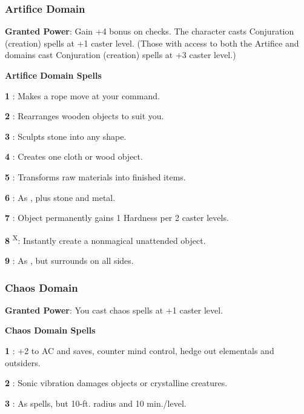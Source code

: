 \subsubsection{Artifice Domain}

\textbf{Granted Power}: Gain +4 bonus on  checks. The character casts Conjuration (creation) spells at +1 caster level. (Those with access to both the Artifice and  domains cast Conjuration (creation) spells at +3 caster level.)

\textbf{Artifice Domain Spells}

\textbf{1} : Makes a rope move at your command.

\textbf{2} : Rearranges wooden objects to suit you.

\textbf{3} : Sculpts stone into any shape.

\textbf{4} : Creates one cloth or wood object.

\textbf{5} : Transforms raw materials into finished items.

\textbf{6} : As , plus stone and metal.

\textbf{7} : Object permanently gains 1 Hardness per 2 caster levels.

\textbf{8} \textsuperscript{X}: Instantly create a nonmagical unattended object.

\textbf{9} : As , but surrounds on all sides.

\subsubsection{Chaos Domain}

\textbf{Granted Power}: You cast chaos spells at +1 caster level.

\textbf{Chaos Domain Spells}

\textbf{1} : +2 to AC and saves, counter mind control, hedge out elementals and outsiders.

\textbf{2} : Sonic vibration damages objects or crystalline creatures.

\textbf{3} : As  spells, but 10-ft. radius and 10 min./level.


